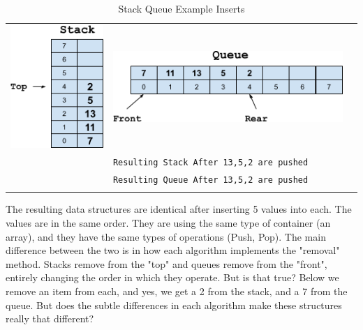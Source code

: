 \begin{longtable}{|M{2cm}|M{6cm}|M{6cm}|}
    \includegraphics[scale=.35]{images/stack_intro_04.png} & \includegraphics[scale=.35]{images/queue_intro_04.png} \\
    &
    \begin{minipage}[l]{6cm}
    \texttt{Resulting Stack After 13,5,2 are pushed} 
    \end{minipage}\\
    & 
    \begin{minipage}[l]{6cm}
    \vspace{5mm}
    \texttt{Resulting Queue After 13,5,2 are pushed} 
    \end{minipage}\\
    \hline 
    \caption{Stack Queue Example Inserts}
    \label{table:visible_stack_queue_add}
\end{longtable}

The resulting data structures are identical after inserting 5 values into each. The values are in the same order. They are using the same type of container (an array), and they have the same types of operations (Push, Pop). The main difference between the two is in how each algorithm implements the  "removal" method. Stacks remove from the "top" and queues remove from the "front", entirely changing the order in which they operate. But is that true? Below we remove an item from each, and yes, we get a 2 from the stack, and a 7 from the queue. But does the subtle differences in each algorithm make these structures really that different?

